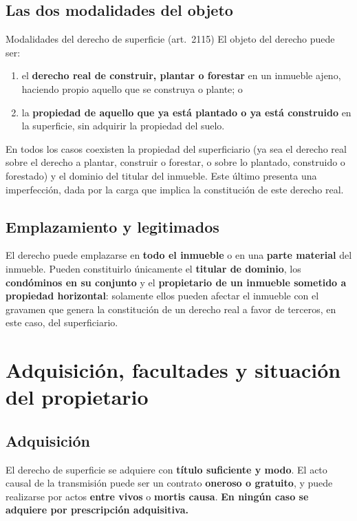 \documentclass[12pt,oneside]{book}
\begin{document}
\subsection{Las dos modalidades del objeto}

\begin{definicion}{Modalidades del derecho de superficie (art.~2115)}
El objeto del derecho puede ser:
\begin{enumerate}[label=(\alph*)]
    \item el \textbf{derecho real de construir, plantar o forestar} en un inmueble ajeno, haciendo propio aquello que se construya o plante; o
    \item la \textbf{propiedad de aquello que ya está plantado o ya está construido} en la superficie, sin adquirir la propiedad del suelo.
\end{enumerate}
\end{definicion}

En todos los casos coexisten la propiedad del superficiario (ya sea el derecho real sobre el derecho a plantar, construir o forestar, o sobre lo plantado, construido o forestado) y el dominio del titular del inmueble. Este último presenta una imperfección, dada por la carga que implica la constitución de este derecho real.

\subsection{Emplazamiento y legitimados}

El derecho puede emplazarse en \textbf{todo el inmueble} o en una \textbf{parte material} del inmueble. Pueden constituirlo únicamente el \textbf{titular de dominio}, los \textbf{condóminos en su conjunto} y el \textbf{propietario de un inmueble sometido a propiedad horizontal}: solamente ellos pueden afectar el inmueble con el gravamen que genera la constitución de un derecho real a favor de terceros, en este caso, del superficiario.

\section{Adquisición, facultades y situación del propietario}

\subsection{Adquisición}

El derecho de superficie se adquiere con \textbf{título suficiente y modo}. El acto causal de la transmisión puede ser un contrato \textbf{oneroso o gratuito}, y puede realizarse por actos \textbf{entre vivos} o \textbf{mortis causa}. \textbf{En ningún caso se adquiere por prescripción adquisitiva.}
\end{document}
